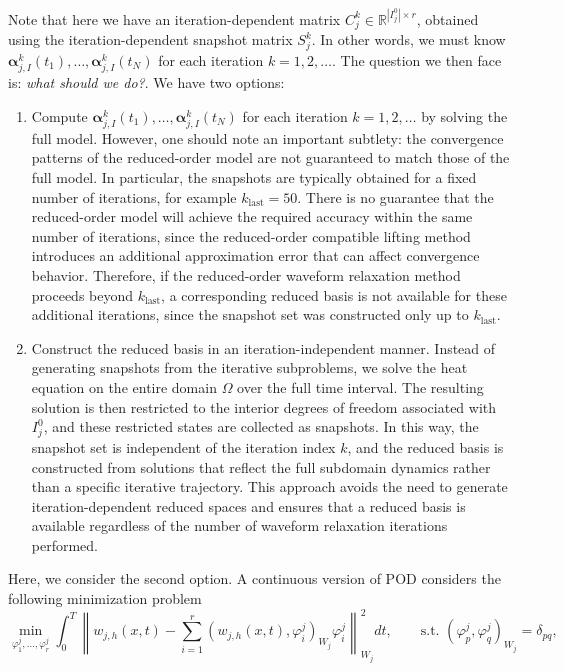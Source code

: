 \documentclass[a4paper, 11pt]{article}
\theoremstyle{remark}
\begin{document}
Note that here we have an iteration-dependent matrix $C^{k}_{j}\in \mathbb{R}^{|I_{j}^{0}|\times r}$, obtained using the iteration-dependent snapshot matrix $S_{j}^{k}$. In other words, we must know $\boldsymbol{\alpha}_{j, I}^{k}(t_{1}), \ldots, \boldsymbol{\alpha}_{j, I}^{k}(t_{N})$ for each iteration $k=1, 2, \ldots$. The question we then face is: \textit{what should we do?}. We have two options:
\begin{enumerate}
    \item Compute $\boldsymbol{\alpha}_{j, I}^{k}(t_{1}), \ldots, \boldsymbol{\alpha}_{j, I}^{k}(t_{N})$ for each iteration $k=1, 2, \ldots$ by solving the full model. However, one should note an important subtlety: the convergence patterns of the reduced-order model are not guaranteed to match those of the full model. In particular, the snapshots are typically obtained for a fixed number of iterations, for example $k_{\text{last}} = 50$. There is no guarantee that the reduced-order model will achieve the required accuracy within the same number of iterations, since the reduced-order compatible lifting method introduces an additional approximation error that can affect convergence behavior. Therefore, if the reduced-order waveform relaxation method proceeds beyond $k_{\text{last}}$, a corresponding reduced basis is not available for these additional iterations, since the snapshot set was constructed only up to $k_{\text{last}}$.
    \item Construct the reduced basis in an iteration-independent manner. Instead of generating snapshots from the iterative subproblems, we solve the heat equation on the entire domain $\Omega$ over the full time interval. The resulting solution is then restricted to the interior degrees of freedom associated with $I_j^0$, and these restricted states are collected as snapshots. In this way, the snapshot set is independent of the iteration index $k$, and the reduced basis is constructed from solutions that reflect the full subdomain dynamics rather than a specific iterative trajectory. This approach avoids the need to generate iteration-dependent reduced spaces and ensures that a reduced basis is available regardless of the number of waveform relaxation iterations performed.
\end{enumerate}
Here, we consider the second option. A continuous version of POD considers the following minimization problem
\begin{equation*}
    \min_{\varphi^{j}_{1}, \ldots, \varphi^{j}_{r}}\int_{0}^{T}\left\lVert w_{j, h}(x, t) - \sum_{i=1}^{r}(w_{j, h}(x, t), \varphi^{j}_{i})_{W_{j}}\varphi^{j}_{i}\right\rVert_{W_{j}}^{2} dt, \qquad \text{s.t. } (\varphi^{j}_{p}, \varphi^{j}_{q})_{W_{j}} = \delta_{pq},
\end{equation*}
\end{document}
